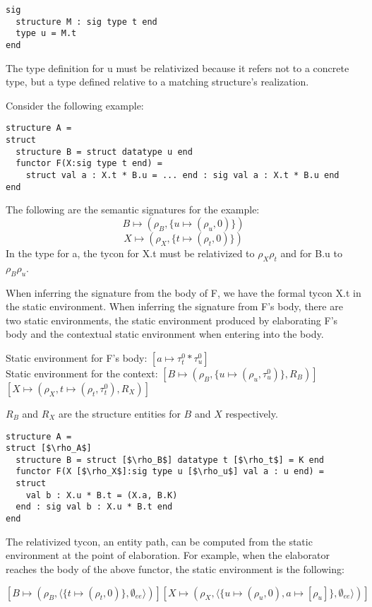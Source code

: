 \begin{lstlisting}
sig
  structure M : sig type t end
  type u = M.t 
end
\end{lstlisting}

\noindent The type definition for u must be relativized because it refers not to a concrete type, but a type defined relative to a matching structure's realization.

Consider the following example:
\begin{lstlisting}
structure A =
struct
  structure B = struct datatype u end
  functor F(X:sig type t end) = 
    struct val a : X.t * B.u = ... end : sig val a : X.t * B.u end
end
\end{lstlisting}

The following are the semantic signatures for the example:
\[B \mapsto (\rho_B, \{u \mapsto (\rho_u, 0)\})\]
\[X \mapsto (\rho_X, \{t \mapsto (\rho_t, 0)\})\]
In the type for a, the tycon for X.t must be relativized to $\rho_X\rho_t$ and for B.u to $\rho_B\rho_u$. 

When inferring the signature from the body of F, we have the formal tycon X.t in the static environment. When inferring the signature from F's body, there are two static environments, the static environment produced by elaborating F's body and the contextual static environment when entering into the body. 

Static environment for F's body: $[a \mapsto \tau_t^0 * \tau_u^0 ]$ \\
Static environment for the context: $[B \mapsto (\rho_B, \{u \mapsto (\rho_u, \tau_u^0)\}, R_B)]$\\
                 $[X \mapsto (\rho_X, {t \mapsto (\rho_t, \tau_t^0)}, R_X)]$

$R_B$ and $R_X$ are the structure entities for $B$ and $X$ respectively. 


\begin{lstlisting}
structure A =
struct [$\rho_A$]
  structure B = struct [$\rho_B$] datatype t [$\rho_t$] = K end
  functor F(X [$\rho_X$]:sig type u [$\rho_u$] val a : u end) =
  struct 
    val b : X.u * B.t = (X.a, B.K)
  end : sig val b : X.u * B.t end
end
\end{lstlisting}

The relativized tycon, an entity path, can be computed from the static environment at the point of elaboration. For example, when the elaborator reaches the body of the above functor, the static environment is the following:

$[B\mapsto (\rho_B, \langle \{t \mapsto (\rho_t, 0)\}, \emptyset_{ee}\rangle)][X\mapsto (\rho_X,\langle\{u\mapsto(\rho_u,0), a\mapsto [\rho_u]\},\emptyset_{ee}\rangle)]$

